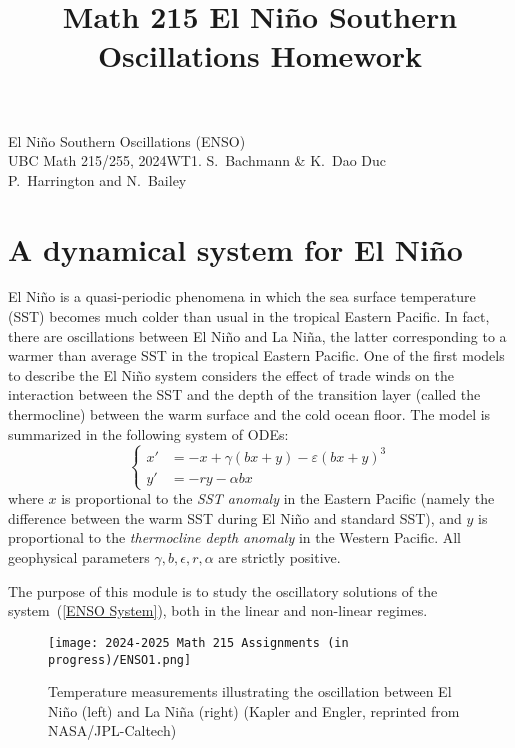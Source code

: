 \documentclass[10pt, letterpaper, answer]{exam}
\title{Math 215 El Ni\~no Southern Oscillations Homework}
\begin{document}
\begin{center}
{\Large El Ni\~no Southern Oscillations (ENSO)} \\ \vspace{1cm} UBC Math 215/255, 2024WT1. S.~Bachmann \& K.~Dao Duc \\
P.~Harrington and N.~Bailey
\end{center}


\section{A dynamical system for El Ni\~no}

El Ni\~no is a quasi-periodic phenomena in which the sea surface temperature (SST) becomes much colder than usual in the tropical Eastern Pacific. In fact, there are oscillations between El Ni\~no and La Ni\~na, the latter corresponding to a warmer than average SST  in the tropical Eastern Pacific. One of the first models to describe the El Ni\~no system considers the effect of trade winds on the interaction between the SST and the depth of the transition layer (called the thermocline) between the warm surface and the cold ocean floor. The model is summarized in the following system of ODEs:
\begin{equation}\label{ENSO System}
\begin{cases}
    x' & = -x + \gamma (bx + y) - \varepsilon (bx + y)^3 \\
    y' & = -ry - \alpha  b x
\end{cases}   
\end{equation}
where $x$ is proportional to the \emph{SST anomaly} in the Eastern Pacific (namely the difference between the warm SST during El Ni\~no and standard SST), and $y$ is  proportional to the \emph{thermocline depth anomaly} in the Western Pacific. All geophysical parameters $\gamma,b,\epsilon,r,\alpha$ are strictly positive.

The purpose of this module is to study the oscillatory solutions of the system~(\ref{ENSO System}), both in the linear and non-linear regimes. 

\begin{figure}[h]
    \centering
    \texttt{[image: 2024-2025 Math 215 Assignments (in progress)/ENSO1.png]}
    \caption{Temperature measurements illustrating the oscillation between El Ni\~no (left) and La Ni\~na (right) (Kapler and Engler, reprinted from NASA/JPL-Caltech)}
    \label{fig:enter-label}
\end{figure}
\end{document}
